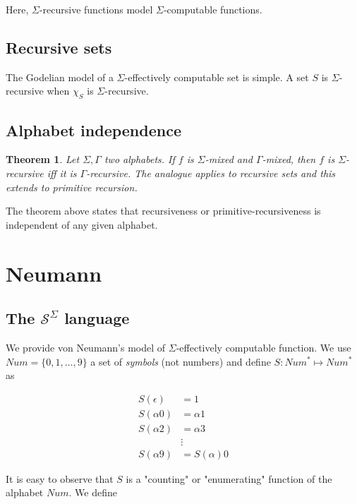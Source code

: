 \documentclass[a4paper, 12pt]{article}
\newtheorem{theorem}{Theorem}
\newtheorem{theorem}{Theorem}
\begin{document}
Here, $\Sigma$-recursive functions model $\Sigma$-computable functions.

\subsection{Recursive sets}

The Godelian model of a $\Sigma$-effectively computable set is simple. A set $S$
is $\Sigma$-recursive when $\chi_{S}$ is $\Sigma$-recursive.

\subsection{Alphabet independence}

\begin{theorem} Let $\Sigma, \Gamma$ two alphabets. If $f$ is $\Sigma$-mixed and
$\Gamma$-mixed, then $f$ is $\Sigma$-recursive iff it is $\Gamma$-recursive. The
analogue applies to recursive sets and this extends to primitive recursion.
\end{theorem}

The theorem above states that recursiveness or primitive-recursiveness is
independent of any given alphabet.


\pagebreak 

\section{Neumann}

\subsection{The $\mathcal{S}^{\Sigma}$ language}

We provide von Neumann's model of $\Sigma$-effectively computable function. We
use $Num = \{0, 1, \ldots, 9\}$ a set of \textit{symbols} (not numbers) and
define $S : Num^{*} \mapsto Num^{*}$ as 

\begin{align*}
    S(\epsilon) &= 1 \\
    S(\alpha 0) &= \alpha 1 \\
    S(\alpha 2) &= \alpha 3 \\
                &\vdots \\ 
    S(\alpha 9) &= S(\alpha) 0
\end{align*}

It is easy to observe that $S$ is a "counting" or "enumerating" function of the
alphabet $Num$. We define 
\end{document}
